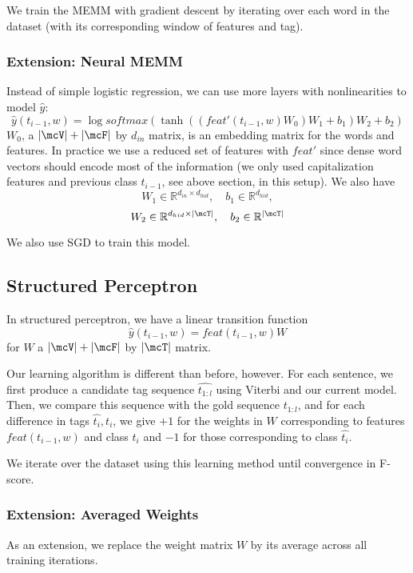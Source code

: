 \documentclass[11pt]{article}
\begin{document}
We train the MEMM with gradient descent by iterating over each word in the dataset (with its corresponding window of features and tag).

\subsubsection{Extension: Neural MEMM}

Instead of simple logistic regression, we can use more layers with nonlinearities to model $\widehat{y}$:
$$\widehat{y}(t_{i-1}, w) = \log softmax( \tanh((feat'(t_{i-1}, w)W_0)W_1 + b_1)W_2 + b_2)$$
$W_0$, a $|\mcV| + |\mcF|$ by $d_{in}$ matrix, is an embedding matrix for the words and features. In practice we use a reduced set of features with $feat'$ since dense word vectors should encode most of the information (we only used capitalization features and previous class $t_{i-1}$, see above section, in this setup). We also have
$$W_1 \in \mathbb{R}^{d_{in} \times d_{hid}}, \quad b_1 \in \mathbb{R}^{d_{hid}},$$
$$W_2 \in \mathbb{R}^{d_{hid} \times |\mcT|}, \quad b_2 \in \mathbb{R}^{|\mcT|}$$

We also use SGD to train this model.

\subsection{Structured Perceptron}

In structured perceptron, we have a linear transition function
$$\widehat{y}(t_{i-1}, w) = feat(t_{i-1}, w)W$$
for $W$ a $|\mcV| + |\mcF|$ by $|\mcT|$ matrix.

Our learning algorithm is different than before, however. For each sentence, we first produce a candidate tag sequence $\widehat{t_{1:l}}$ using Viterbi and our current model. Then, we compare this sequence with the gold sequence $t_{1:l}$, and for each difference in tags $\widehat{t_i}, t_i$, we give $+1$ for the weights in $W$ corresponding to features $feat(t_{i-1}, w)$ and class $t_i$ and $-1$ for those corresponding to class $\widehat{t_i}$.

We iterate over the dataset using this learning method until convergence in F-score.

\subsubsection{Extension: Averaged Weights}

As an extension, we replace the weight matrix $W$ by its average across all training iterations. 
\end{document}
